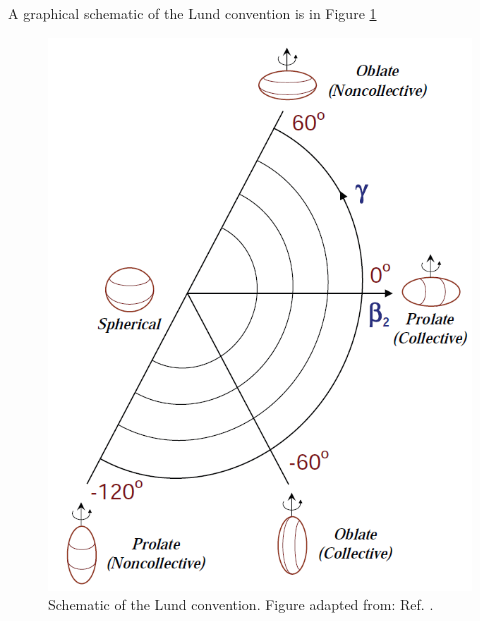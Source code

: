 A graphical schematic of the Lund convention is in Figure \ref{fig:chp2-lund}
\begin{figure}[t!]
\label{fig:chp2-lund}
\centerline{\includegraphics[height=0.25\textheight]{./img/c2/lundconv.png}}
	\caption{Schematic of the Lund convention. Figure adapted from: Ref. \cite{danielDissertation}.}
\end{figure}
